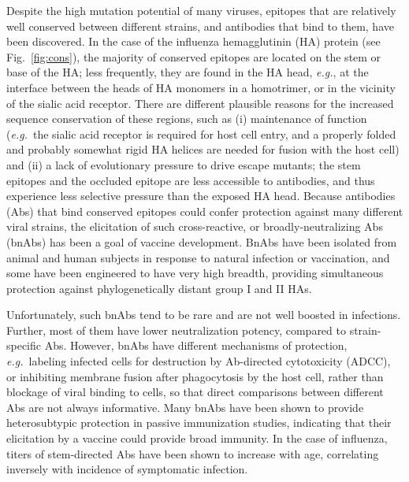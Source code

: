 \documentclass[utf8]{frontiersHLTH}%
\def\eg {{\it e.g.}}
\newcommand{\fig}[1]{Fig.~\ref{fig:#1}}
\begin{document}
Despite the high mutation potential of many viruses,
epitopes that are relatively well conserved between different strains, and
antibodies that bind to them, have been discovered. In the case of the
influenza hemagglutinin (HA) protein (see \fig{cons}), 
the majority of conserved epitopes are located
on the stem or base of the HA\cite{nachbagauer17,corti17};
less frequently, they are found in the HA head, \eg,
at the interface between the heads of HA monomers\cite{watanabe19,bajic19}
in a homotrimer, or in the vicinity of the sialic acid receptor\cite{raymond18,bajic19a}.
There are different plausible reasons for the increased sequence
conservation of these regions, such as (i) maintenance of function (\eg~the
sialic acid receptor is required for host cell entry, and a properly
folded and probably somewhat rigid HA helices are needed for fusion with the
host cell) and (ii) a lack of evolutionary pressure to drive escape
mutants\cite{raymond18}; the stem epitopes and the occluded epitope\cite{watanabe19}
are less accessible to antibodies, and thus
experience less selective pressure than the exposed HA head.
Because antibodies (Abs) that bind conserved epitopes could confer protection
against many different viral strains, the elicitation of such cross-reactive, or
broadly-neutralizing Abs (bnAbs) has been a goal of vaccine development.\cite{nachbagauer17}
BnAbs have been isolated from animal and human subjects in response
to natural infection or vaccination,\cite{corti17} and some have been engineered\cite{kallewaard16}
to have very high breadth, providing simultaneous protection
against phylogenetically distant group I and II HAs.\cite{corti11,li12,kallewaard16}

Unfortunately, such bnAbs tend to be rare and are not well boosted in
infections\cite{li12,ellebedy14,tan19,arevalo20}.
Further, most of them have lower neutralization potency, compared to strain-specific Abs.
However, bnAbs have
different mechanisms of protection, \eg~labeling infected cells for
destruction by Ab-directed cytotoxicity (ADCC), or inhibiting membrane
fusion after phagocytosis by the host cell,\cite{nachbagauer17} rather than blockage of viral
binding to cells, so that direct comparisons between different Abs are not always
informative.
Many bnAbs have been shown to provide heterosubtypic protection in
passive immunization studies,\cite{corti17} indicating that their elicitation by
a vaccine could provide broad immunity. In the case of
influenza, titers of stem-directed Abs have been shown to increase with
age, correlating inversely with incidence of symptomatic
infection.\cite{Nachbagauer16}
\end{document}

